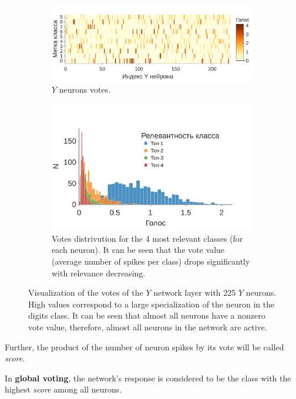 \documentclass[a4paper]{article}
\begin{document}
\begin{figure}
\centering
\begin{subfigure}{\textwidth}
    \includegraphics[width=\textwidth,keepaspectratio=true]{votes_ru.pdf}
    \caption{$Y$ neurons votes.}
\end{subfigure}
\begin{subfigure}{\textwidth} 
    \includegraphics[width=\textwidth,keepaspectratio=true]{votes_distr_4_ru.pdf}
    \caption{Votes distrivution for the 4 most relevant classes (for each neuron). It can be seen that the vote value (average number of spikes per class) drops significantly with relevance decreasing.}
\end{subfigure}
\caption{Visualization of the votes of the $ Y $ network layer with 225 $ Y $ neurons. High values correspond to a large specialization of the neuron in the digits class. It can be seen that almost all neurons have a nonzero vote value, therefore, almost all neurons in the network are active.}
\end{figure}

Further, the product of the number of neuron spikes by its vote will be called \textit{score}.

In \textbf{global voting}, the network's response is considered to be the class with the highest \textit{score} among all neurons.
\end{document}
